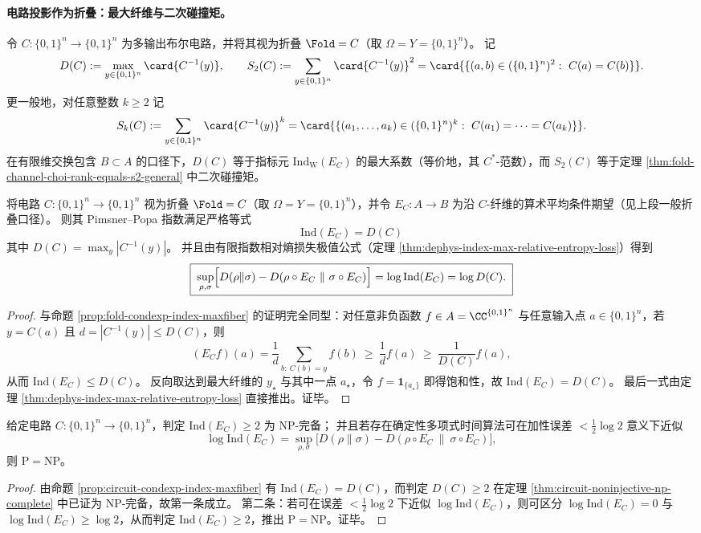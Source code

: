 \paragraph{电路投影作为折叠：最大纤维与二次碰撞矩。}
令 \(C:\{0,1\}^n\to\{0,1\}^n\) 为多输出布尔电路，并将其视为折叠 \(\Fold=C\)（取 \(\Omega=Y=\{0,1\}^n\)）。
记
\[
D(C):=\max_{y\in\{0,1\}^n}\card{C^{-1}(y)},
\qquad
S_2(C):=\sum_{y\in\{0,1\}^n}\card{C^{-1}(y)}^2
=\card{\{(a,b)\in(\{0,1\}^n)^2:\ C(a)=C(b)\}}.
\]
更一般地，对任意整数 \(k\ge 2\) 记
\[
S_k(C):=\sum_{y\in\{0,1\}^n}\card{C^{-1}(y)}^k
=\card{\{(a_1,\dots,a_k)\in(\{0,1\}^n)^k:\ C(a_1)=\cdots=C(a_k)\}}.
\]
在有限维交换包含 \(B\subset A\) 的口径下，\(D(C)\) 等于指标元 \(\mathrm{Ind}_{\mathrm W}(E_C)\) 的最大系数（等价地，其 \(C^\ast\)-范数），而 \(S_2(C)\) 等于定理 \ref{thm:fold-channel-choi-rank-equals-s2-general} 中二次碰撞矩。

\begin{proposition}[电路粗粒化条件期望的有限指数与最坏信息损失]\label{prop:circuit-condexp-index-maxfiber}
将电路 \(C:\{0,1\}^n\to\{0,1\}^n\) 视为折叠 \(\Fold=C\)（取 \(\Omega=Y=\{0,1\}^n\)），并令 \(E_C:A\to B\) 为沿 \(C\)-纤维的算术平均条件期望（见上段一般折叠口径）。
则其 Pimsner--Popa 指数满足严格等式
\[
\boxed{\;\mathrm{Ind}(E_C)=D(C)\;}
\]
其中 \(D(C)=\max_y |C^{-1}(y)|\)。
并且由有限指数相对熵损失极值公式（定理 \ref{thm:dephys-index-max-relative-entropy-loss}）得到
\[
\boxed{\;
\sup_{\rho,\sigma}\Bigl[D(\rho\|\sigma)-D(\rho\circ E_C\ \|\ \sigma\circ E_C)\Bigr]
=\log\mathrm{Ind}(E_C)=\log D(C).\;}
\]
\end{proposition}
\begin{proof}
与命题 \ref{prop:fold-condexp-index-maxfiber} 的证明完全同型：对任意非负函数 \(f\in A=\CC^{\{0,1\}^n}\) 与任意输入点 \(a\in\{0,1\}^n\)，若 \(y=C(a)\) 且 \(d=|C^{-1}(y)|\le D(C)\)，则
\[
(E_C f)(a)=\frac{1}{d}\sum_{b:\ C(b)=y}f(b)\ \ge\ \frac{1}{d}f(a)\ \ge\ \frac{1}{D(C)}f(a),
\]
从而 \(\mathrm{Ind}(E_C)\le D(C)\)。
反向取达到最大纤维的 \(y_\star\) 与其中一点 \(a_\star\)，令 \(f=\mathbf 1_{\{a_\star\}}\) 即得饱和性，故 \(\mathrm{Ind}(E_C)=D(C)\)。
最后一式由定理 \ref{thm:dephys-index-max-relative-entropy-loss} 直接推出。证毕。
\end{proof}

\begin{corollary}\label{cor:circuit-index-entropy-loss-np-hard}
给定电路 \(C:\{0,1\}^n\to\{0,1\}^n\)，判定 \(\mathrm{Ind}(E_C)\ge 2\) 为 \(\mathrm{NP}\)-完备；
并且若存在确定性多项式时间算法可在加性误差 \(<\tfrac12\log 2\) 意义下近似
\[
\log\mathrm{Ind}(E_C)=\sup_{\rho,\sigma}\bigl[D(\rho\|\sigma)-D(\rho\circ E_C\ \|\ \sigma\circ E_C)\bigr],
\]
则 \(\mathrm{P}=\mathrm{NP}\)。
\end{corollary}
\begin{proof}
由命题 \ref{prop:circuit-condexp-index-maxfiber} 有 \(\mathrm{Ind}(E_C)=D(C)\)，而判定 \(D(C)\ge 2\) 在定理 \ref{thm:circuit-noninjective-np-complete} 中已证为 \(\mathrm{NP}\)-完备，故第一条成立。
第二条：若可在误差 \(<\tfrac12\log 2\) 下近似 \(\log\mathrm{Ind}(E_C)\)，则可区分
\(
\log\mathrm{Ind}(E_C)=0
\)
与
\(
\log\mathrm{Ind}(E_C)\ge \log 2
\)，从而判定 \(\mathrm{Ind}(E_C)\ge 2\)，推出 \(\mathrm{P}=\mathrm{NP}\)。证毕。
\end{proof}

